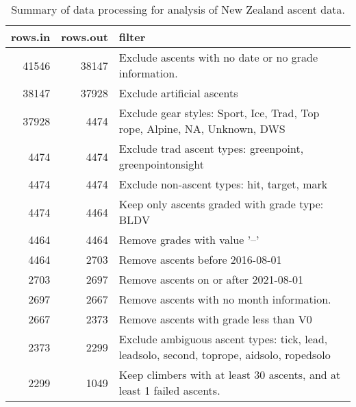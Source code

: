 \begin{table}[ht]
\centering
\begingroup\fontsize{9pt}{10pt}\selectfont
\begin{tabular}{rrl}
  \hline
{\bf rows.in} & {\bf rows.out} & {\bf filter} \\ 
  \hline
41546 & 38147 & Exclude ascents with no date or no grade information. \\ 
  38147 & 37928 & Exclude artificial ascents \\ 
  37928 & 4474 & Exclude gear styles: Sport, Ice, Trad, Top rope, Alpine, NA, Unknown, DWS \\ 
  4474 & 4474 & Exclude trad ascent types: greenpoint, greenpointonsight \\ 
  4474 & 4474 & Exclude non-ascent types: hit, target, mark \\ 
  4474 & 4464 & Keep only ascents graded with grade type: BLDV \\ 
  4464 & 4464 & Remove grades with value '--' \\ 
  4464 & 2703 & Remove ascents before 2016-08-01 \\ 
  2703 & 2697 & Remove ascents on or after 2021-08-01 \\ 
  2697 & 2667 & Remove ascents with no month information. \\ 
  2667 & 2373 & Remove ascents with grade less than V0 \\ 
  2373 & 2299 & Exclude ambiguous ascent types: tick, lead, leadsolo, second, toprope, aidsolo, ropedsolo \\ 
  2299 & 1049 & Keep climbers with at least 30 ascents, and at least 1 failed ascents. \\ 
   \hline
\end{tabular}
\endgroup
\caption{Summary of data processing for analysis of New Zealand ascent data.} 
\label{table-data-processing-nz}
\end{table}
